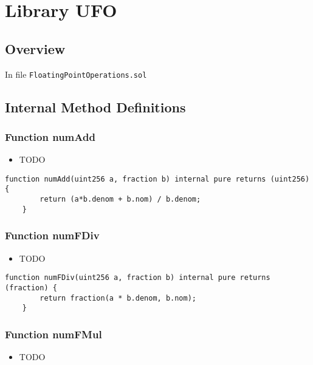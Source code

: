 
\chapter{Library UFO}

\minitoc

\section{Overview}


In file {\tt FloatingPointOperations.sol}

\section{Internal Method Definitions}


\subsection{Function numAdd}

\noindent\begin{itemize}
\item TODO
\end{itemize}

\begin{lstlisting}[firstnumber=114]
    function numAdd(uint256 a, fraction b) internal pure returns (uint256) {
        return (a*b.denom + b.nom) / b.denom;
    }
\end{lstlisting}

\subsection{Function numFDiv}

\noindent\begin{itemize}
\item TODO
\end{itemize}

\begin{lstlisting}[firstnumber=110]
    function numFDiv(uint256 a, fraction b) internal pure returns (fraction) {
        return fraction(a * b.denom, b.nom);
    }
\end{lstlisting}

\subsection{Function numFMul}

\noindent\begin{itemize}
\item TODO
\end{itemize}

